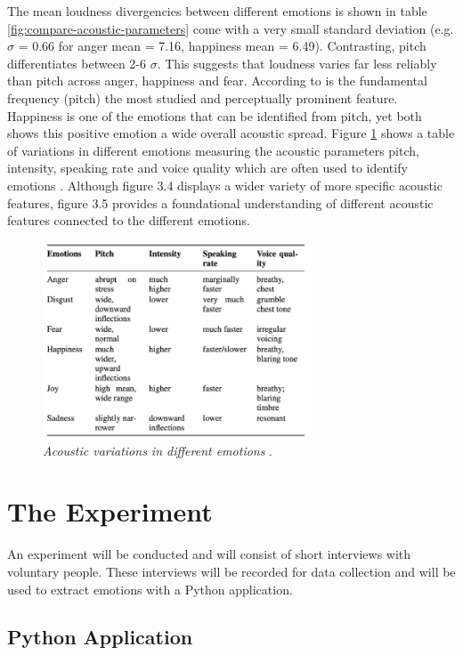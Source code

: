 The mean loudness divergencies between different emotions is shown in table \ref{fig:compare-acoustic-parameters} come with a very small standard deviation (e.g. $\sigma$ = 0.66 for anger mean = 7.16, happiness mean = 6.49). Contrasting, pitch differentiates between 2-6 $\sigma$. 
This suggests that loudness varies far less reliably than pitch across anger, happiness and fear. According to \textcite{Banse1996} is the fundamental frequency (pitch) the most studied and perceptually prominent feature. Happiness is one of the emotions that can be identified from pitch, yet both \textcites{Banse1996}{Ekberg2023} shows this positive emotion a wide overall acoustic spread. 
Figure \ref{fig:acoustic-variations} shows a table of variations in different emotions measuring the acoustic parameters pitch, intensity, speaking rate and voice quality which are often used to identify emotions \autocite{Khalil2019}. Although figure 3.4 displays a wider variety of more specific acoustic features, figure 3.5 provides a foundational understanding of different acoustic features connected to the different emotions.

\begin{figure}[h]
    \centering
    \includegraphics[width=8cm]{png/Figure8-AcousticVariations.png}
    \caption{\textit{Acoustic variations in different emotions} \autocite{Khalil2019}.}
    \label{fig:acoustic-variations}
\end{figure}

\section{The Experiment}

An experiment will be conducted and will consist of short interviews with voluntary people. These interviews will be recorded for data collection and will be used to extract emotions with a Python application. 

\subsection{Python Application}

